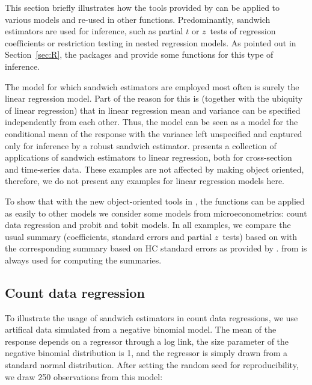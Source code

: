 \documentclass{Z}
\begin{document}
This section briefly illustrates how the tools provided by 
can be applied to various models and re-used in other functions. Predominantly,
sandwich estimators are used for inference, such as partial $t$ or $z$~tests
of regression coefficients or restriction testing in nested regression 
models. As pointed out in Section~\ref{sec:R}, the packages 
\citep{hac:Zeileis+Hothorn:2002} and  \citep{hac:Fox:2002} provide
some functions for this type of inference.

The model for which sandwich estimators are employed most often is surely
the linear regression model. Part of the reason for this is (together
with the ubiquity of linear regression) that in linear regression mean
and variance can be specified independently from each other. Thus, the 
model can be seen as a model for the conditional mean of the response
with the variance left unspecified and captured only for inference by a robust
sandwich estimator. \cite{hac:Zeileis:2004a} presents a collection of
applications of sandwich estimators to linear regression, both for cross-section
and time-series data. These examples are not affected by making
 object oriented, therefore, we do not present any examples
for linear regression models here.

To show that with the new object-oriented tools in , the
functions can be applied as easily to other models we consider some models
from microeconometrics: count data regression and probit and tobit models.
In all examples, we compare the usual summary (coefficients, standard
errors and partial $z$~tests) based on  with the corresponding summary
based on HC standard errors as provided by . 
from  is always used for computing the summaries.


\subsection{Count data regression}

To illustrate the usage of sandwich estimators in count data regressions,
we use artifical data simulated from a negative binomial model. The
mean of the response  depends on a regressor  through
a log link, the size parameter of the negative binomial distribution
is 1, and the regressor is simply drawn from a standard normal distribution.
After setting the random seed for reproducibility, we draw 250 observations
from this model:
\end{document}
